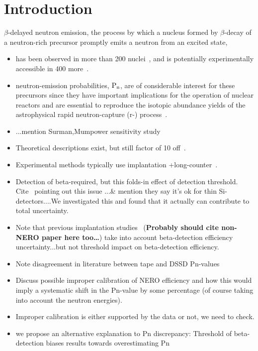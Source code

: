 \section{Introduction}

$\beta$-delayed neutron emission, the process by which a nucleus
formed by $\beta$-decay of a neutron-rich precursor promptly emits a
neutron from an excited state, 
\begin{itemize}
\item has been observed in more than 200 nuclei~\cite{Borg13}, and is potentially experimentally accessible in 400 more~\cite{Dill14}. 
\item neutron-emission probabilities, $\rm{P}_{n}$, are of considerable interest for these 
precursors since they have important implications for the operation
of nuclear reactors and are essential to reproduce the isotopic
abundance yields of the
astrophysical rapid neutron-capture (r-) process~\cite{Gome14}. 
\item ...mention Surman,Mumpower sensitivity study
  \item Theoretical descriptions exist, but still factor of 10
  off~\cite{Krat73,Mier13}.
  \item Experimental methods typically use implantation
  +long-counter~\cite{Mehr96,Mont06}.
 \item Detection of beta-required, but this folds-in effect of detection
  threshold. Cite~\cite{Math12} pointing out this issue ...\& mention
  they say it's ok for thin Si-detectors....We investigated this and
  found that it actually can contribute to total uncertainty.
  \item Note that previous implantation
  studies~\cite{Mont06,Pere09,Hosm10} ({\bf Probably should cite
  non-NERO paper here too\dots})
  take into account beta-detection efficiency uncertainty...but not
  threshold impact on beta-detection efficiency.
  \item Note disagreement in literature between tape and DSSD Pn-values
  \item Discuss possible improper calibration of NERO efficiency and how
  this would imply a systematic shift in the Pn-value by some
  percentage (of course taking into account the neutron energies).
  \item Improper calibration is either supported by the data or not, we need to check.
  \item we propose an alternative explanation to Pn discrepancy:
	 Threshold of beta-detection biases results towards
	 overestimating Pn
\end{itemize}